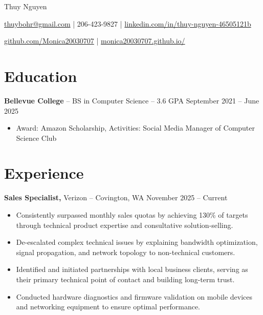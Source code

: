 \documentclass[11pt]{article}       %
\begin{document}
\centerline{\Huge Thuy Nguyen}

\vspace{5pt}

\centerline{\href{mailto:thuybohr@gmail.com}{thuybohr@gmail.com} | 206-423-9827 |
\href{https://www.linkedin.com/in/thuy-nguyen-46505121b/}{linkedin.com/in/thuy-nguyen-46505121b}}

\centerline{\href{https://github.com/Monica20030707}{github.com/Monica20030707} | 
\href{https://monica20030707.github.io/}{monica20030707.github.io/}} 

\vspace{-9pt}

\section*{Education}
\textbf{Bellevue College} -- BS in Computer Science -- 3.6 GPA \hfill September 2021 -- June 2025\\
\vspace{-9pt}
\begin{itemize}
  \item Award: Amazon Scholarship, Activities: Social Media Manager of Computer Science Club
\end{itemize}

\vspace{-18.5pt}

\section*{Experience}

\textbf{Sales Specialist,} {Verizon} -- Covington, WA \hfill November 2025 -- Current \\
\vspace{-9pt}
\begin{itemize}
  \item Consistently surpassed monthly sales quotas by achieving 130\% of targets through technical product expertise and consultative solution-selling.
  \item De-escalated complex technical issues by explaining bandwidth optimization, signal propagation, and network topology to non-technical customers.
  \item Identified and initiated partnerships with local business clients, serving as their primary technical point of contact and building long-term trust.
  \item Conducted hardware diagnostics and firmware validation on mobile devices and networking equipment to ensure optimal performance.
\end{itemize}
\end{document}

